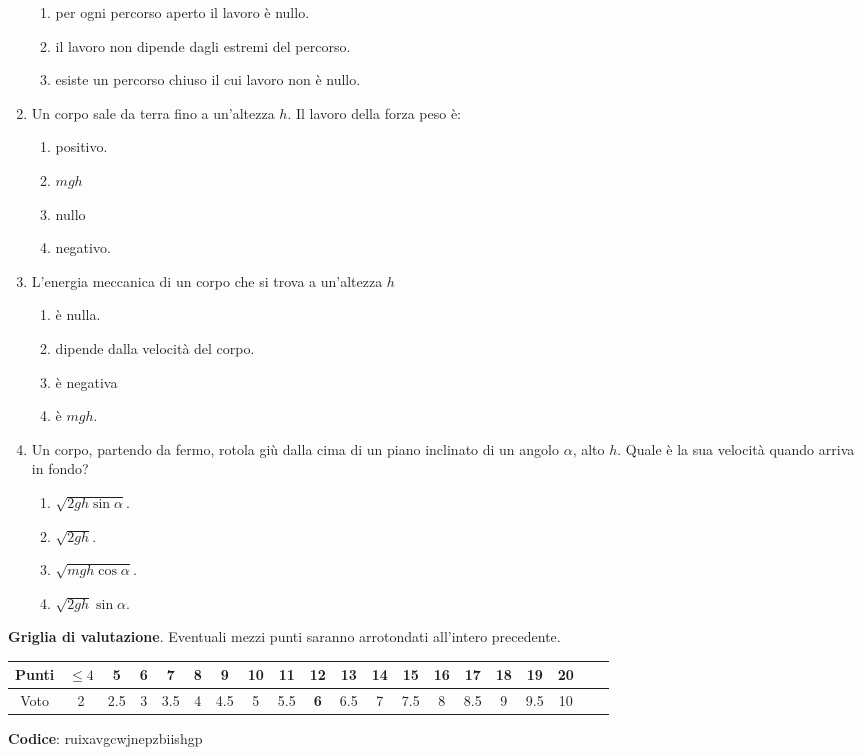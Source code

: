 \documentclass{article}
\begin{document}
\begin{enumerate}
\begin{enumerate}[label=\Alph*.]
    \item per ogni percorso aperto il lavoro è nullo.
    \item il lavoro non dipende dagli estremi del percorso.
    \item esiste un percorso chiuso il cui lavoro non è nullo.
  \end{enumerate}
  \item Un corpo sale da terra fino a un'altezza $h$. Il lavoro della forza peso è:
  \begin{enumerate}[label=\Alph*.]
    \item positivo.
    \item $mgh$
    \item nullo
    \item negativo.
  \end{enumerate}
  \item L'energia meccanica di un corpo che si trova a un'altezza $h$
  \begin{enumerate}[label=\Alph*.]
    \item è nulla.
    \item dipende dalla velocità del corpo.
    \item è negativa
    \item è $mgh$.
  \end{enumerate}
  \item Un corpo, partendo da fermo, rotola giù dalla cima di un piano inclinato di un angolo $\alpha$, alto $h$. Quale è la sua velocità quando arriva in fondo?
  \begin{enumerate}[label=\Alph*.]
    \item $\sqrt{2gh\sin\alpha}$.
    \item $\sqrt{2gh}$.
    \item $\sqrt{mgh\cos\alpha}$.
    \item $\sqrt{2gh}\sin\alpha$.
  \end{enumerate}
\end{enumerate}








\newpage \maketitle \centering \textbf{Griglia di valutazione}. Eventuali mezzi punti saranno arrotondati all'intero precedente. \begin{table}[h]     \centering \begin{tabular}{|c|c|c|c|c|c|c|c|c|c|c|c|c|c|c|c|c|c|c|c|} \hline Punti &  $\leq 4$ & 5 & 6 & 7 & 8 & 9 & 10 & 11 & \textbf{12} & 13 & 14 & 15 & 16 & 17 & 18 & 19 & 20 \\ \hline Voto & 2 & 2.5 & 3 & 3.5 & 4 & 4.5 & 5 & 5.5 & \textbf{6} & 6.5 & 7 & 7.5 & 8 & 8.5 & 9 & 9.5 & 10 \\ \hline \end{tabular} \end{table}
\textbf{Codice}: ruixavgcwjnepzbiishgp
\end{document}
